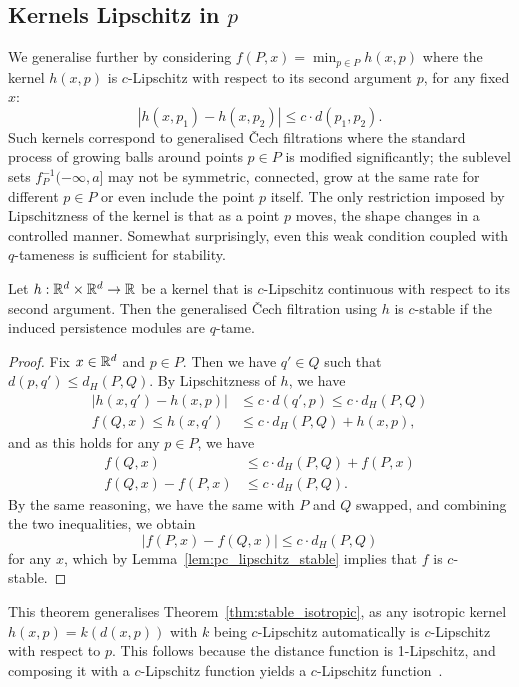 \subsection{Kernels Lipschitz in $p$}

We generalise further by considering $f(P, x) = \min_{p \in P} h(x, p)$
where the kernel $h(x, p)$ is $c$-Lipschitz with respect to its second argument
$p$, for any fixed $x$:
\begin{equation}
    |h(x, p_1) - h(x, p_2)| \leq c \cdot d(p_1, p_2).
\end{equation}
Such kernels correspond to generalised \v{C}ech filtrations where the standard
process of growing balls around points $p \in P$ is modified significantly;
the sublevel sets $f_P^{-1}(-\infty, a]$ may not be symmetric, connected, grow
at the same rate for different $p \in P$ or even include the point $p$ itself.
The only restriction imposed by Lipschitzness of the kernel is that as a point
$p$ moves, the shape changes in a controlled manner. Somewhat surprisingly, even
this weak condition coupled with $q$-tameness is sufficient for stability.
\begin{theorem}
    Let $h : \mathbb{R}^d \times \mathbb{R}^d \to \mathbb{R}$ be a kernel that is $c$-Lipschitz
    continuous with respect to its second argument. Then the generalised
    \v{C}ech filtration using $h$ is $c$-stable if the induced persistence
    modules are $q$-tame.
\end{theorem}
\begin{proof}
    Fix $x \in \mathbb{R}^d$ and $p \in P$. Then we have $q' \in Q$ such that $d(p, q')
    \leq d_H(P, Q)$. By Lipschitzness of $h$, we have
    \begin{align}
        |h(x, q') - h(x, p)| & \leq c \cdot d(q', p) \leq c \cdot d_H(P, Q) \\
        f(Q, x) \leq h(x, q') & \leq c \cdot d_H(P, Q) + h(x, p),
    \end{align}
    and as this holds for any $p \in P$, we have
    \begin{align}
        f(Q, x) & \leq c \cdot d_H(P, Q) + f(P, x) \\
        f(Q, x) - f(P, x) & \leq c \cdot d_H(P, Q).
    \end{align}
    By the same reasoning, we have the same with $P$ and $Q$ swapped,
    and combining the two inequalities, we obtain
    \begin{equation}
        |f(P, x) - f(Q, x)| \leq c \cdot d_H(P, Q)
    \end{equation}
    for any $x$, which by Lemma~\ref{lem:pc_lipschitz_stable} implies that
    $f$ is $c$-stable.
\end{proof}
This theorem generalises Theorem~\ref{thm:stable_isotropic},
as any isotropic kernel $h(x, p) = k(d(x, p))$ with $k$ being $c$-Lipschitz
automatically is $c$-Lipschitz with respect to $p$. This follows because the
distance function is 1-Lipschitz, and composing it with a $c$-Lipschitz function
yields a $c$-Lipschitz function~\cite{weaver2018lipschitz}.

